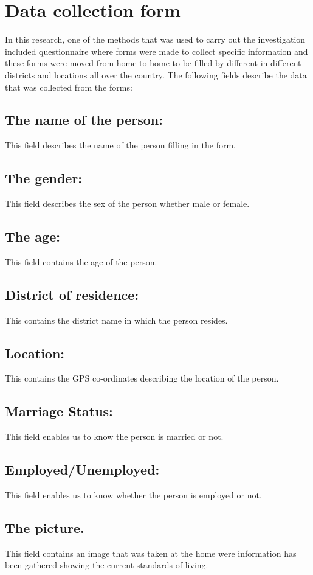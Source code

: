 \documentclass[a4paper,12pt]{article}
\begin{document}
\section{Data collection form}
In this research, one of the methods that was used to carry out the investigation included questionnaire where forms were made to collect specific information and these forms were moved from home to home to be filled by different in different districts and locations all over the country.
The following fields describe the data that was collected from the forms:
\subsection{The name of the person:}
This field describes the name of the person filling in the form.
\subsection{The gender:}
This field describes the sex of the person whether male or female.

\subsection{The age:}
This field contains the age of the person.
\subsection{District of residence: }
This contains the district name in which the person resides.
\subsection{Location:}
This contains the GPS co-ordinates describing the location of the person.
\subsection{Marriage Status:}
This field enables us to know the person is married or not.
\subsection{Employed/Unemployed:}
This field enables us to know whether the person is employed or not.
\subsection{The picture.}
This field contains an image that was taken at the home were information has been gathered showing the current standards of living.
\end{document}
